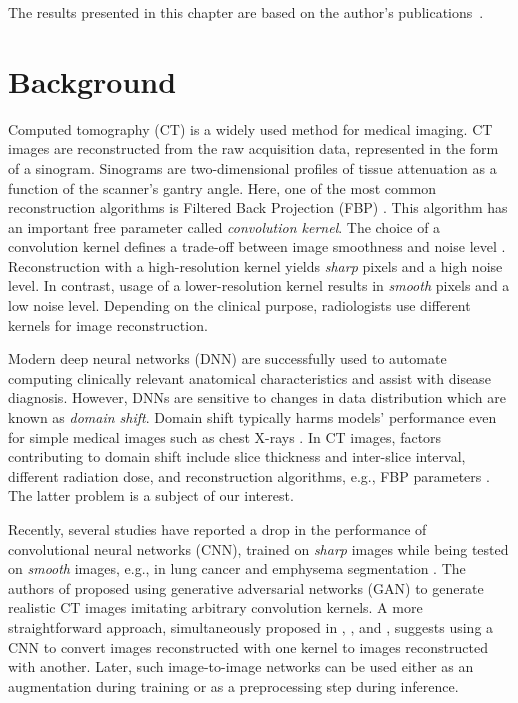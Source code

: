 The results presented in this chapter are based on the author’s publications~\cite{saparov2021zero,shimovolos2022adaptation}.


\section{Background}

Computed tomography (CT) is a widely used method for medical imaging. CT images are reconstructed from the raw acquisition data, represented in the form of a sinogram. Sinograms are two-dimensional profiles of tissue attenuation as a function of the scanner's gantry angle. Here, one of the most common reconstruction algorithms is Filtered Back Projection (FBP) \cite{schofield2020image}. This algorithm has an important free parameter called \textit{convolution kernel}. The choice of a convolution kernel defines a trade-off between image smoothness and noise level \cite{schaller2003spatial}. Reconstruction with a high-resolution kernel yields \textit{sharp} pixels and a high noise level. In contrast, usage of a lower-resolution kernel results in \textit{smooth} pixels and a low noise level. Depending on the clinical purpose, radiologists use different kernels for image reconstruction.

Modern deep neural networks (DNN) are successfully used to automate computing clinically relevant anatomical characteristics and assist with disease diagnosis. However, DNNs are sensitive to changes in data distribution which are known as \textit{domain shift}. Domain shift typically harms models' performance even for simple medical images such as chest X-rays \cite{zech2018variable}. In CT images, factors contributing to domain shift include slice thickness and inter-slice interval, different radiation dose, and reconstruction algorithms, e.g., FBP parameters \cite{kloenne2020domain}. The latter problem is a subject of our interest.

Recently, several studies have reported a drop in the performance of convolutional neural networks (CNN), trained on \textit{sharp} images while being tested on \textit{smooth} images, e.g., in lung cancer \cite{choe2019deep} and emphysema segmentation \cite{lee2019ct}. The authors of \cite{sandfort2019data} proposed using generative adversarial networks (GAN) to generate realistic CT images imitating arbitrary convolution kernels. A more straightforward approach, simultaneously proposed in \cite{missert2019simulation}, \cite{choe2019deep}, and \cite{lee2019ct}, suggests using a CNN to convert images reconstructed with one kernel to images reconstructed with another. Later, such image-to-image networks can be used either as an augmentation during training or as a preprocessing step during inference.

